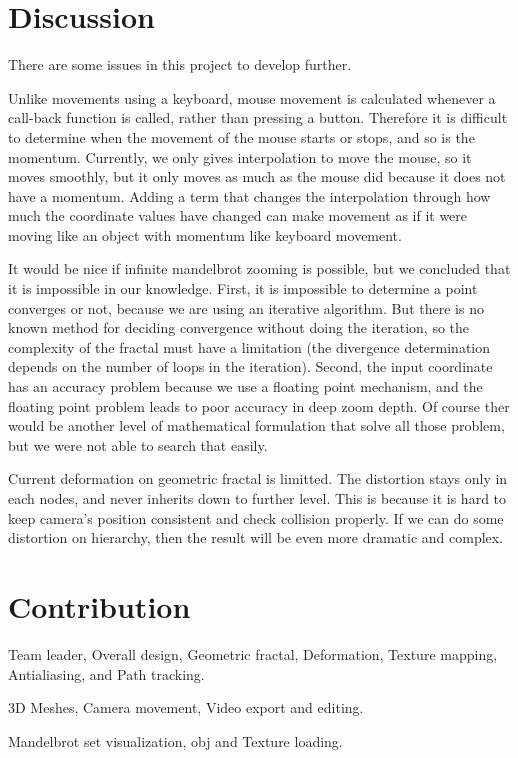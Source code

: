 \documentclass[a4paper]{article}
\begin{document}
\section{Discussion}
There are some issues in this project to develop further.
\begin{description}[style=nextline]
\item[Smooth Camera Movement]
Unlike movements using a keyboard, mouse movement is calculated whenever a call-back function is called, rather than pressing a button.
Therefore it is difficult to determine when the movement of the mouse starts or stops, and so is the momentum.
Currently, we only gives interpolation to move the mouse, so it moves smoothly, but it only moves as much as the mouse did because it does not have a momentum.
Adding a term that changes the interpolation through how much the coordinate values have changed can make movement as if it were moving like an object with momentum like keyboard movement.
\item[Infinite Mandelbrot zoom]
It would be nice if infinite mandelbrot zooming is possible, but we concluded that it is impossible in our knowledge.
First, it is impossible to determine a point converges or not, because we are using an iterative algorithm.
But there is no known method for deciding convergence without doing the iteration, so the complexity of the fractal must have a limitation (the divergence determination depends on the number of loops in the iteration).
Second, the input coordinate has an accuracy problem because we use a floating point mechanism, and the floating point problem leads to poor accuracy in deep zoom depth.
Of course ther would be another level of mathematical formulation that solve all those problem, but we were not able to search that easily.
\item[Further deformation]
Current deformation on geometric fractal is limitted. The distortion stays only in each nodes, and never inherits down to further level.
This is because it is hard to keep camera's position consistent and check collision properly.
If we can do some distortion on hierarchy, then the result will be even more dramatic and complex.
\end{description}

\section{Contribution}
\begin{description}[style=nextline]
\item[Yang Junha]
Team leader, Overall design, Geometric fractal, Deformation, Texture mapping, Antialiasing, and Path tracking.
\item[Ryu Sangwoo]
3D Meshes, Camera movement, Video export and editing.
\item[Sung Haebin]
Mandelbrot set visualization, obj and Texture loading.
\end{description}
\end{document}
